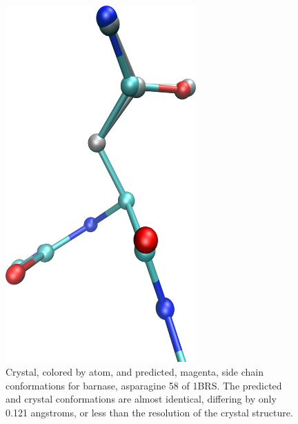 \begin{figure}[h]
    \centering
    \includegraphics[width=0.65\textwidth,height=0.3\textheight,keepaspectratio]{figures/mutation_side_chain_images/1brs_chain_a_resid_58.png}
    \caption{Crystal, colored by atom, and predicted, magenta, side chain conformations for barnase, asparagine 58 of 1BRS.
    The predicted and crystal conformations are almost identical, differing by only 0.121 angstroms, or less than the resolution of the crystal structure.}
    \label{figure:computational_mutation_scanning/1brs_a_58}
\end{figure}

